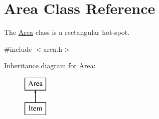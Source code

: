 \hypertarget{classArea}{
\section{Area Class Reference}
\label{classArea}
}


The \hyperlink{classArea}{Area} class is a rectangular hot-\/spot.  




{\ttfamily \#include $<$area.h$>$}

Inheritance diagram for Area:\begin{figure}[H]
\begin{center}
\leavevmode
\includegraphics[height=2.000000cm]{classArea}
\end{center}
\end{figure}

